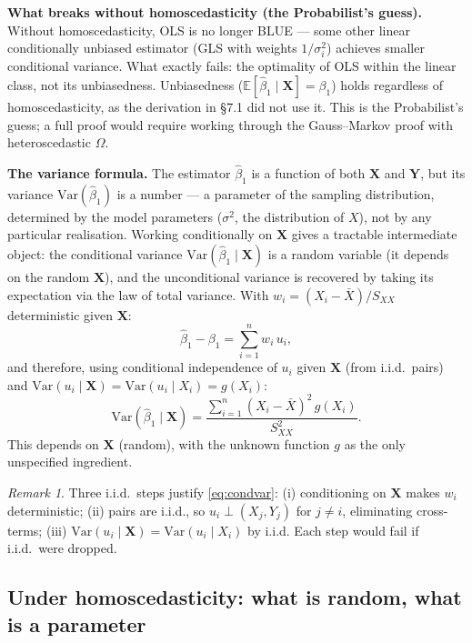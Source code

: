 \documentclass[a4paper,oneside,12pt]{extarticle}
\theoremstyle{plain}
\theoremstyle{definition}
\theoremstyle{remark}
\newtheorem{remark}[proposition]{Remark}
\newcommand*{\E}{\mathbb{E}}
\newcommand*{\Var}{\mathrm{Var}}
\begin{document}
\textbf{What breaks without homoscedasticity (the Probabilist's guess).}
Without homoscedasticity, OLS is no longer BLUE --- some other linear
conditionally unbiased estimator (GLS with weights $1/\sigma_i^2$)
achieves smaller conditional variance. What exactly fails: the
optimality of OLS within the linear class, not its unbiasedness.
Unbiasedness ($\E[\hat\beta_1 \mid \mathbf{X}]=\beta_1$) holds
regardless of homoscedasticity, as the derivation in §7.1 did not
use it. This is the Probabilist's guess; a full proof would require working
through the Gauss--Markov proof with heteroscedastic $\Omega$.

\textbf{The variance formula.}
The estimator $\hat\beta_1$ is a function of both $\mathbf{X}$ and
$\mathbf{Y}$, but its variance $\Var(\hat\beta_1)$ is a number --- a
parameter of the sampling distribution, determined by the model
parameters ($\sigma^2$, the distribution of $X$), not by any particular
realisation. Working conditionally on $\mathbf{X}$ gives a tractable
intermediate object: the conditional variance $\Var(\hat\beta_1\mid\mathbf{X})$
is a random variable (it depends on the random $\mathbf{X}$), and the
unconditional variance is recovered by taking its expectation via the
law of total variance.  With $w_i = (X_i-\bar X)/S_{XX}$
deterministic given $\mathbf{X}$:
\[
  \hat\beta_1 - \beta_1 = \sum_{i=1}^n w_i\, u_i,
\]
and therefore, using conditional independence of $u_i$ given
$\mathbf{X}$ (from i.i.d.\ pairs) and $\Var(u_i\mid\mathbf{X}) =
\Var(u_i\mid X_i) = g(X_i)$:
\begin{equation}
\label{eq:condvar}
  \Var(\hat\beta_1 \mid \mathbf{X})
  = \frac{\sum_{i=1}^n (X_i-\bar X)^2\,g(X_i)}{S_{XX}^2}.
\end{equation}
This depends on $\mathbf{X}$ (random), with the unknown function $g$
as the only unspecified ingredient.

\begin{remark}
Three i.i.d.\ steps justify \eqref{eq:condvar}: (i) conditioning on
$\mathbf{X}$ makes $w_i$ deterministic; (ii) pairs are i.i.d., so
$u_i \perp (X_j,Y_j)$ for $j\neq i$, eliminating cross-terms; (iii)
$\Var(u_i\mid\mathbf{X}) = \Var(u_i\mid X_i)$ by i.i.d. Each step
would fail if i.i.d.\ were dropped.
\end{remark}

\subsection{Under homoscedasticity: what is random, what is a parameter}
\end{document}
